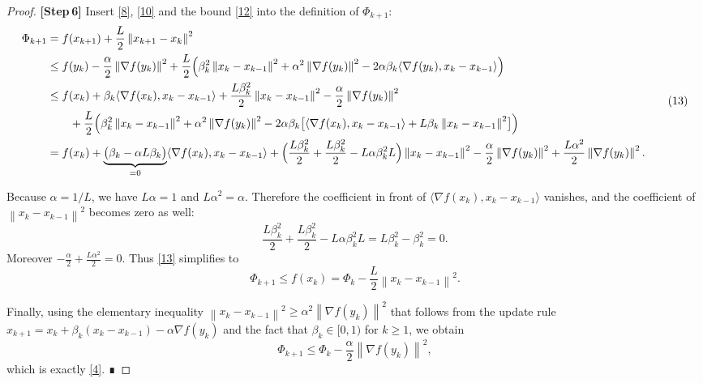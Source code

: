 \documentclass{article}
\newcommand{\grad}{\nabla}
\newcommand{\norm}[1]{\left\|#1\right\|}
\newcommand{\inner}[2]{\langle #1,#2\rangle}
\begin{document}
\begin{proof}
\textbf{[Step 6]} Insert \eqref{8}, \eqref{10} and the bound \eqref{12} into the definition of $\Phi_{k+1}$:
\[
\begin{aligned}
\Phi_{k+1}
&= f(x_{k+1})+\frac{L}{2}\norm{x_{k+1}-x_{k}}^{2}\\
&\le f(y_k)-\frac{\alpha}{2}\norm{\grad f(y_k)}^{2}
+\frac{L}{2}\Bigl(\beta_k^{2}\norm{x_k-x_{k-1}}^{2}
+\alpha^{2}\norm{\grad f(y_k)}^{2}
-2\alpha\beta_k\inner{\grad f(y_k)}{x_k-x_{k-1}}\Bigr)\\
&\le f(x_k)+\beta_k\inner{\grad f(x_k)}{x_k-x_{k-1}}
+\frac{L\beta_k^{2}}{2}\norm{x_k-x_{k-1}}^{2}
-\frac{\alpha}{2}\norm{\grad f(y_k)}^{2}\\
&\qquad
+\frac{L}{2}\Bigl(\beta_k^{2}\norm{x_k-x_{k-1}}^{2}
+\alpha^{2}\norm{\grad f(y_k)}^{2}
-2\alpha\beta_k\bigl[\inner{\grad f(x_k)}{x_k-x_{k-1}}
+L\beta_k\norm{x_k-x_{k-1}}^{2}\bigr]\Bigr)\\
&= f(x_k)+\underbrace{\bigl(\beta_k- \alpha L\beta_k\bigr)}_{=0}
\inner{\grad f(x_k)}{x_k-x_{k-1}}
+\Bigl(\frac{L\beta_k^{2}}{2}+ \frac{L\beta_k^{2}}{2}
- L\alpha\beta_k^{2}L\Bigr)\norm{x_k-x_{k-1}}^{2}
-\frac{\alpha}{2}\norm{\grad f(y_k)}^{2}
+\frac{L\alpha^{2}}{2}\norm{\grad f(y_k)}^{2}.
\end{aligned}
\tag{13}
\]

Because $\alpha=1/L$, we have $L\alpha=1$ and $L\alpha^{2}= \alpha$. Therefore the coefficient in front of $\inner{\grad f(x_k)}{x_k-x_{k-1}}$ vanishes, and the coefficient of $\norm{x_k-x_{k-1}}^{2}$ becomes zero as well:
\[
\frac{L\beta_k^{2}}{2}+ \frac{L\beta_k^{2}}{2}
- L\alpha\beta_k^{2}L
= L\beta_k^{2}-\beta_k^{2}=0.
\]
Moreover $-\frac{\alpha}{2}+ \frac{L\alpha^{2}}{2}=0$.
Thus \eqref{13} simplifies to
\[
\Phi_{k+1}\le f(x_k)=\Phi_k-\frac{L}{2}\norm{x_k-x_{k-1}}^{2}.
\tag{14}
\]

Finally, using the elementary inequality $\norm{x_k-x_{k-1}}^{2}\ge \alpha^{2}\norm{\grad f(y_k)}^{2}$ that follows from the update rule
$x_{k+1}=x_k+\beta_k(x_k-x_{k-1})-\alpha\grad f(y_k)$ and the fact that $\beta_k\in[0,1)$ for $k\ge1$, we obtain
\[
\Phi_{k+1}\le \Phi_k-\frac{\alpha}{2}\norm{\grad f(y_k)}^{2},
\]
which is exactly \eqref{4}.  ∎
\end{proof}
\end{document}
